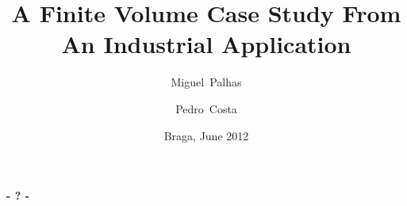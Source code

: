 \documentclass{beamer}
\title[A Finite Volume Case Study]{A Finite Volume Case Study From An Industrial Application}
\author[M. Palhas \and P. Costa]{Miguel~Palhas \and Pedro~Costa}
\institute[19808 \and 19830]{
	Department of Informatics\\
	University of Minho
}
\date{Braga, June 2012}
\begin{document}

\frame[plain]{\titlepage}







% 
% 

\begin{frame}[plain]
	\titlepage
	\begin{center}
		\Huge\bfseries - ? -
	\end{center}
\end{frame}
\end{document}

